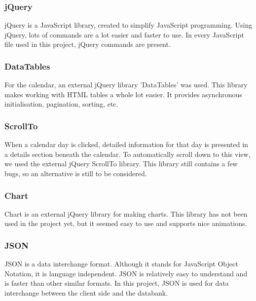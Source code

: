 \subsubsection{jQuery}
jQuery is a JavaScript library, created to simplify JavaScript programming. Using jQuery,
lots of commands are a lot easier and faster to use. In every JavaScript file used in this
project, jQuery commands are present.

\subsubsection{DataTables} 
For the calendar, an external jQuery library 'DataTables' was used. This library makes
working with HTML tables a whole lot easier. It provides asynchronous initialisation,
pagination, sorting, etc.

\subsubsection{ScrollTo}
When a calendar day is clicked, detailed information for that day is presented in a
details section beneath the calendar. To automatically scroll down to this view, we
used the external jQuery ScrollTo library. This library still contains a few bugs, so an
alternative is still to be considered.

\subsubsection{Chart}
Chart is an external jQuery library for making charts. This library has not been used in the project yet,
but it seemed easy to use and supports nice animations.

\subsubsection{JSON}
JSON is a data interchange format. Although it stands for JavaScript Object Notation, it
is language independent. JSON is relatively easy to understand and is faster than other
similar formats. In this project, JSON is used for data interchange between the client
side and the databank. 
